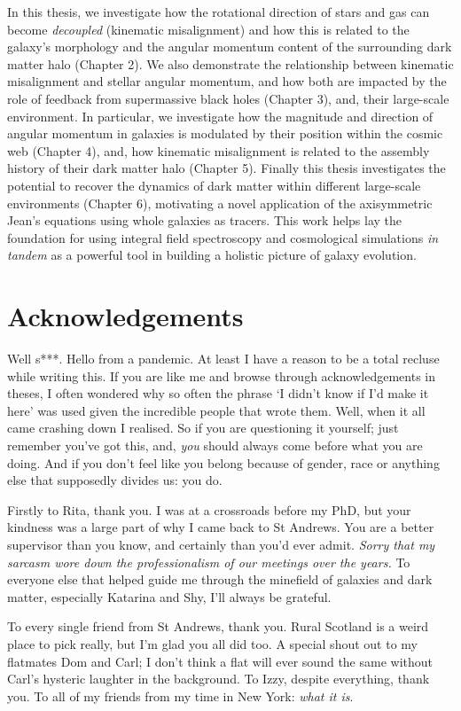 \documentclass[11pt]{book}
\begin{document}
In this thesis, we investigate how the rotational direction of stars and gas can become \textit{decoupled} (kinematic misalignment) and how this is related to the galaxy's morphology and the angular momentum content of the surrounding dark matter halo (Chapter 2). We also demonstrate the relationship between kinematic misalignment and stellar angular momentum, and how both are impacted by the role of feedback from supermassive black holes (Chapter 3), and, their large-scale environment. In particular, we investigate how the magnitude and direction of angular momentum in galaxies is modulated by their position within the cosmic web (Chapter 4), and, how kinematic misalignment is related to the assembly history of their dark matter halo (Chapter 5). Finally this thesis investigates the potential to recover the dynamics of dark matter within different large-scale environments (Chapter 6), motivating a novel application of the axisymmetric Jean's equations using whole galaxies as tracers. This work helps lay the foundation for using integral field spectroscopy and cosmological simulations \textit{in tandem} as a powerful tool in building a holistic picture of galaxy evolution.

\chapter{Acknowledgements}

Well s***. Hello from a pandemic. At least I have a reason to be a total recluse while writing this. If you are like me and browse through acknowledgements in theses, I often wondered why so often the phrase `I didn't know if I'd make it here' was used given the incredible people that wrote them. Well, when it all came crashing down I realised. So if you are questioning it yourself; just remember you've got this, and, \textit{you} should always come before what you are doing. And if you don't feel like you belong because of gender, race or anything else that supposedly divides us: you do. 

Firstly to Rita, thank you. I was at a crossroads before my PhD, but your kindness was a large part of why I came back to St Andrews. You are a better supervisor than you know, and certainly than you'd ever admit. \textit{Sorry that my sarcasm wore down the professionalism of our meetings over the years.} To everyone else that helped guide me through the minefield of galaxies and dark matter, especially Katarina and Shy, I'll always be grateful.

To every single friend from St Andrews, thank you. Rural Scotland is a weird place to pick really, but I'm glad you all did too. A special shout out to my flatmates Dom and Carl; I don't think a flat will ever sound the same without Carl's hysteric laughter in the background. To Izzy, despite everything, thank you. To all of my friends from my time in New York: \textit{what it is}. 
\end{document}
